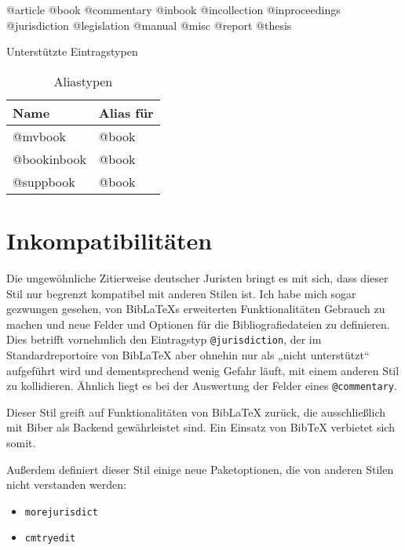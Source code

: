 \documentclass[11pt,a4paper,DIV=calc]{scrartcl}
\newcommand\software[1]{\textsf{#1}}
\newcommand\Biblatex{\software{Bib\LaTeX{}}\xspace}
\begin{document}
\begin{table}
  \centering

  @article @book @commentary @inbook @incollection @inproceedings
  @jurisdiction @legislation @manual @misc @report @thesis

  \caption{Unterstützte Eintragstypen}
  \label{tab:unterstuetzte-typen}
\end{table}

\begin{table}
  \centering
  \begin{tabular}{ll}
    \textbf{Name} & \textbf{Alias für}\\
    \hline
    @mvbook         & @book\\
    @bookinbook     & @book\\
    @suppbook       & @book
  \end{tabular}
  \caption{Aliastypen}
  \label{tab:aliastypen}
\end{table}

\section{Inkompatibilitäten}\label{sec:inkompat}

Die ungewöhnliche Zitierweise deutscher Juristen bringt es mit sich,
dass dieser Stil nur begrenzt kompatibel mit anderen Stilen ist. Ich
habe mich sogar gezwungen gesehen, von \Biblatex{}s erweiterten
Funktionalitäten Gebrauch zu machen und neue Felder und Optionen für
die Bibliografiedateien zu definieren. Dies betrifft vornehmlich den
Eintragstyp \verb+@jurisdiction+, der im Standardreportoire von
\Biblatex aber ohnehin nur als „nicht unterstützt“ aufgeführt wird und
dementsprechend wenig Gefahr läuft, mit einem anderen Stil zu
kollidieren. Ähnlich liegt es bei der Auswertung der Felder eines
\verb+@commentary+.

Dieser Stil greift auf Funktionalitäten von \Biblatex zurück, die
ausschließlich mit \software{Biber} als Backend gewährleistet
sind. Ein Einsatz von \software{Bib\TeX{}} verbietet sich somit.

Außerdem definiert dieser Stil einige neue Paketoptionen, die von
anderen Stilen nicht verstanden werden:

\begin{itemize}
\item \verb+morejurisdict+
\item \verb+cmtryedit+
\end{itemize}
\end{document}
